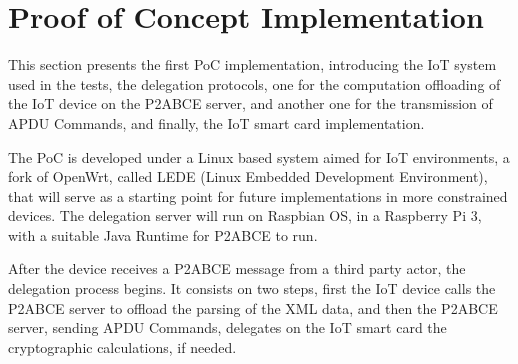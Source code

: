 \section{Proof of Concept Implementation}\label{ch:implementation}
%
%  


This section presents the first PoC implementation, introducing the IoT system used in the tests, the delegation protocols, one for the computation offloading of the IoT device on the P2ABCE server, and another one for the transmission of APDU Commands, and finally, the IoT smart card implementation.

The PoC is developed under a Linux based system aimed for IoT environments, a fork of OpenWrt, called LEDE (Linux Embedded Development Environment), that will serve as a starting point for future implementations in more constrained devices. 
The delegation server will run on Raspbian OS, in a Raspberry Pi 3, with a suitable Java Runtime for P2ABCE to run.





After the device receives a P2ABCE message from a third party actor, the delegation process begins. It consists on two steps, first the IoT device calls the P2ABCE server to offload the parsing of the XML data, and then the P2ABCE server, sending APDU Commands, delegates on the IoT smart card the cryptographic calculations, if needed.


